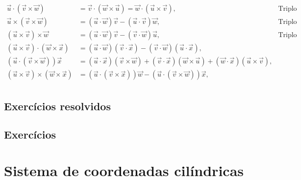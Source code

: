 \begin{subequations}\label{vectoridendities}
\begin{align}
 \vec{u}\cdot\left(\vec{v}\times\vec{w}\right)&=\vec{v}\cdot\left(\vec{w}\times\vec{u}\right)=\vec{w}\cdot\left(\vec{u}\times\vec{v}\right),&\text{Triplo produto escalar}\\ 
 \vec{u}\times\left(\vec{v}\times\vec{w}\right)&=\left(\vec{u}\cdot\vec{w}\right)\vec{v}-\left(\vec{u}\cdot\vec{v}\right)\vec{w},&\text{Triplo produto vetorial} \\ 
 \left(\vec{u}\times\vec{v}\right)\times\vec{w}&=\left(\vec{u}\cdot\vec{w}\right)\vec{v}-\left(\vec{v}\cdot\vec{w}\right)\vec{u},&\text{Triplo produto vetorial} \\ 
 \left(\vec{u}\times\vec{v}\right)\cdot\left(\vec{w}\times\vec{x}\right)&=\left(\vec{u}\cdot\vec{w}\right)\left(\vec{v}\cdot\vec{x}\right)-\left(\vec{v}\cdot\vec{w}\right)\left(\vec{u}\cdot\vec{x}\right),& \\	 
\left(\vec{u}\cdot\left(\vec{v}\times\vec{w}\right)\right)\vec{x}&=\left(\vec{u}\cdot\vec{x}\right)\left(\vec{v}\times\vec{w}\right)+\left(\vec{v}\cdot\vec{x}\right)\left(\vec{w}\times\vec{u}\right)+\left(\vec{w}\cdot\vec{x}\right)\left(\vec{u}\times\vec{v}\right),& \\
\left(\vec{u}\times\vec{v}\right)\times\left(\vec{w}\times\vec{x}\right)
&=\left(\vec{u}\cdot\left(\vec{v}\times\vec{x}\right)\right)\vec{w}-\left(\vec{u}\cdot\left(\vec{v}\times\vec{w}\right)\right)\vec{x},&\\
\end{align}
\end{subequations}

\subsection*{Exercícios resolvidos}

\construirExeresol

\subsection*{Exercícios}

\construirExer



\section{Sistema de coordenadas cilíndricas}

